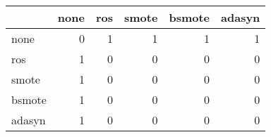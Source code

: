 \begin{tabular}{lrrrrr}
\hline
        &   none &   ros &   smote &   bsmote &   adasyn \\
\hline
 none   &      0 &     1 &       1 &        1 &        1 \\
 ros    &      1 &     0 &       0 &        0 &        0 \\
 smote  &      1 &     0 &       0 &        0 &        0 \\
 bsmote &      1 &     0 &       0 &        0 &        0 \\
 adasyn &      1 &     0 &       0 &        0 &        0 \\
\hline
\end{tabular}